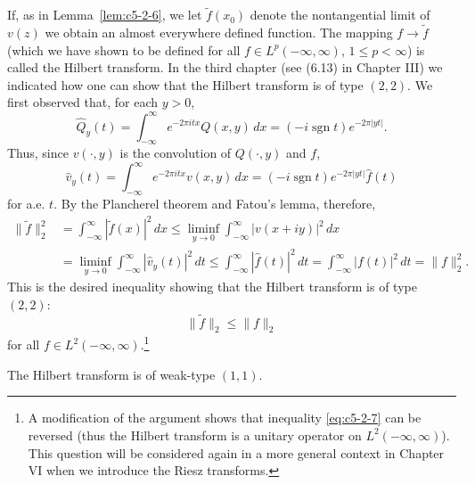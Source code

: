 If, as in Lemma~\ref{lem:c5-2-6}, we let $\tilde{f}(x_{0})$ denote the
nontangential limit of $v(z)$ we obtain an almost everywhere defined function.
The mapping $f \to \tilde{f}$ (which we have shown to be defined for all
$f \in L^{p}(-\infty, \infty)$, $1 \leq p < \infty$) is called the Hilbert
transform. In the third chapter (see (6.13) in Chapter III) we
indicated how one can show that the Hilbert transform is of type $(2, 2)$. We
first observed that, for each $y > 0$,
\[
\hat{Q}_{y}(t)=\int_{-\infty}^{\infty}e^{-2\pi itx}Q(x,y)\,dx
=(-i\operatorname{sgn}t)e^{-2\pi|yt|}.
\]
Thus, since $v(\cdot, y)$ is the convolution of $Q(\cdot, y)$ and $f$,
\[
\hat{v}_{y}(t)=\int_{-\infty}^{\infty}e^{-2\pi itx}v(x,y)\,dx
=(-i\operatorname{sgn}t)e^{-2\pi|yt|}\hat{f}(t)
\]
for a.e. $t$. By the Plancherel theorem and Fatou's lemma, therefore,
\begin{align*}
\|\tilde{f}\|_{2}^{2}&=\int_{-\infty}^{\infty}|\tilde{f}(x)|^{2}\,dx
\leq\liminf_{y \to 0}\int_{-\infty}^{\infty}|v(x+iy)|^{2}\,dx\\
&=\liminf_{y \to 0}\int_{-\infty}^{\infty}|\hat{v}_{y}(t)|^{2}\,dt
\leq\int_{-\infty}^{\infty}|\hat{f}(t)|^{2}\,dt
=\int_{-\infty}^{\infty}|f(t)|^{2}\,dt=\|f\|_{2}^{2}.
\end{align*}
This is the desired inequality showing that the Hilbert transform is of type
$(2, 2)$:
\begin{equation}\label{eq:c5-2-7}
\|\tilde{f}\|_{2}\leq\|f\|_{2}
\end{equation}
for all $f \in L^{2}(-\infty, \infty)$.\footnote{A modification of the argument
shows that inequality \eqref{eq:c5-2-7} can be reversed (thus the Hilbert
transform is a unitary operator on $L^{2}(-\infty, \infty)$). This question
will be considered again in a more general context in Chapter VI when we
introduce the Riesz transforms.}

\begin{lemma}\label{lem:c5-2-8}
The Hilbert transform is of weak-type $(1, 1)$.
\end{lemma}

